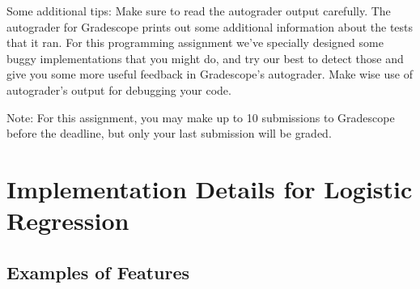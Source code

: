 \documentclass[11pt]{exam}
\numberwithin{equation}{section} %
\numberwithin{figure}{section} %
\numberwithin{table}{section} %
\begin{document}
Some additional tips: 
Make sure to read the autograder output carefully. The autograder for Gradescope prints out some additional 
information about the tests that it ran. For this programming assignment we've specially designed some buggy implementations that you might do, and try our best to detect those and give you some more useful feedback in Gradescope's autograder. Make wise use of autograder's output for debugging your code. 
 

Note: For this assignment, you may make up to 10 submissions to Gradescope before the deadline, but only your last submission will be graded.
    
    



\newpage

\appendix


\section{Implementation Details for Logistic Regression}

\subsection{Examples of Features}
\end{document}
